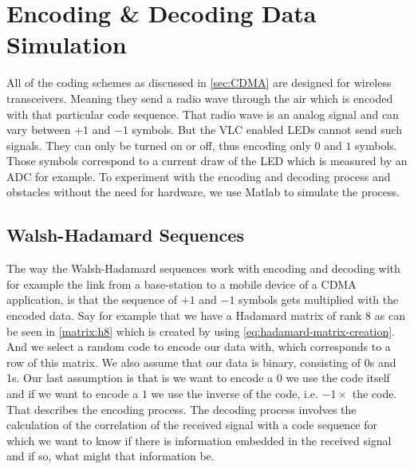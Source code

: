 
\section{Encoding \& Decoding Data Simulation}
\label{sec:enc-dec-theory}

	All of the coding schemes as discussed in \autoref{sec:CDMA} are designed for wireless transceivers.
	Meaning they send a radio wave through the air which is encoded with that particular code sequence.
	That radio wave is an analog signal and can vary between $+1$ and $-1$ symbols.
	But the VLC enabled LEDs cannot send such signals.
	They can only be turned on or off, thus encoding only $0$ and $1$ symbols.
	Those symbols correspond to a current draw of the LED which is measured by an ADC for example.
	To experiment with the encoding and decoding process and obstacles without the need for hardware, we use Matlab to simulate the process.

	\subsection{Walsh-Hadamard Sequences}

		The way the Walsh-Hadamard sequences work with encoding and decoding with for example the link from a base-station to a mobile device of a CDMA application, is that the sequence of $+1$ and $-1$ symbols gets multiplied with the encoded data. 
		Say for example that we have a Hadamard matrix of rank $8$ as can be seen in \autoref{matrix:h8} which is created by using \autoref{eq:hadamard-matrix-creation}.
		And we select a random code to encode our data with, which corresponds to a row of this matrix.
		We also assume that our data is binary, consisting of 0s and 1s. 
		Our last assumption is that is we want to encode a $0$ we use the code itself and if we want to encode a $1$ we use the inverse of the code, i.e. $-1 \times$ the code.
		That describes the encoding process. 
		The decoding process involves the calculation of the correlation of the received signal with a code sequence for which we want to know if there is information embedded in the received signal and if so, what might that information be.

